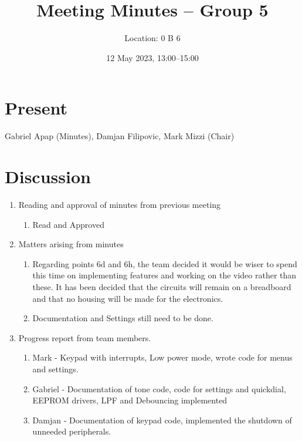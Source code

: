 \documentclass[11pt,a4paper]{scrartcl}
\title{Meeting Minutes -- Group 5}
\author{Location: 0 B 6}
\date{12 May 2023, 13:00--15:00}
\begin{document}
\maketitle

\section*{Present}
Gabriel Apap (Minutes),
Damjan Filipovic,
Mark Mizzi (Chair)

\section*{Discussion}

\begin{enumerate}

\item Reading and approval of minutes from previous meeting
\begin{enumerate}
    \item Read and Approved
\end{enumerate}


\item Matters arising from minutes
\begin{enumerate}
    \item Regarding points 6d and 6h, the team decided it would be wiser to spend this time on implementing features and working on the video rather than these. It has been decided that the circuits will remain on a breadboard and that no housing will be made for the electronics.
    \item Documentation and Settings still need to be done.
\end{enumerate}

\item Progress report from team members.
\begin{enumerate}
    \item Mark - Keypad with interrupts, Low power mode, wrote code for menus and settings.
    \item Gabriel - Documentation of tone code, code for settings and quickdial, EEPROM drivers, LPF and Debouncing implemented
    \item Damjan - Documentation of keypad code, implemented the shutdown of unneeded peripherals.
\end{enumerate}


\end{enumerate}
\end{document}
